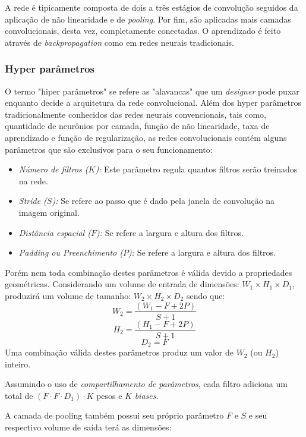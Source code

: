 A rede é tipicamente composta de dois a três estágios de convolução seguidos da
aplicação de não linearidade e de \emph{pooling}. Por fim, são aplicadas mais
camadas convolucionais, desta vez, completamente conectadas. O aprendizado é
feito através de \emph{backpropagation} como em redes neurais
tradicionais.\cite{lecun2015deep}

\subsubsection{Hyper parâmetros}

O termo "hiper parâmetros" se refere as "alavancas" que um \emph{designer} pode
puxar enquanto decide a arquitetura da rede convolucional. Além dos hyper
parâmetros tradicionalmente conhecidos das redes neurais convencionais, tais
como, quantidade de neurônios por camada, função de não linearidade, taxa de
aprendizado e função de regularização, as redes convolucionais contém alguns
parâmetros que são exclusivos para o seu funcionamento:

\begin{itemize}

  \item \emph{Número de filtros ($K$):} Este parâmetro regula quantos filtros
    serão treinados na rede.
  \item \emph{Stride ($S$):} Se refere ao passo que é dado pela
    janela de convolução na imagem original.
  \item \emph{Distância espacial ($F$):}
    Se refere a largura e altura dos filtros.
  \item \emph{Padding ou Preenchimento
      ($P$):} Se refere a largura e altura dos filtros.

\end{itemize}

Porém nem toda combinação destes parâmetros é válida devido a propriedades
geométricas. Considerando um volume de entrada de dimensões: $W_1 \times H_1
\times D_1$, produzirá um volume de tamanho: $W_2 \times H_2 \times D_2$ sendo
que: $$ W_2= \frac{(W_1-F+2P)}{S+1} $$ $$ H_2= \frac{(H_1-F+2P)}{S+1} $$ $$
D_2= F $$ Uma combinação válida destes parâmetros produz um valor de $W_2$ (ou
$H_2$) inteiro.

Assumindo o uso de \emph{compartilhamento de parâmetros}, cada filtro adiciona
um total de $(F \cdot F \cdot D_1)\cdot K$ pesos e $K$ \emph{biases}.

A camada de pooling também possui seu próprio parâmetro $F$ e $S$ e seu
respectivo volume de saída terá as dimensões:

